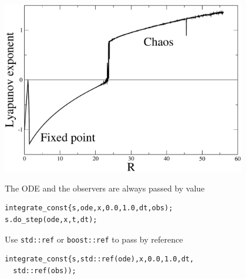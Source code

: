 \begin{frame}[fragile]


 \vspace{4ex}

\centerline{\includegraphics[draft=false,width=0.8\textwidth]{lyap_lorenz.pdf}}

\end{frame}







\begin{frame}

\end{frame}


\begin{frame}[fragile]

\vspace{2ex}

 The ODE and the observers are always passed by value

 \begin{lstlisting}
integrate_const{s,ode,x,0.0,1.0,dt,obs);
s.do_step(ode,x,t,dt);
 \end{lstlisting}

\pause

\vspace{2ex}
Use {\tt std::ref} or {\tt boost::ref} to pass by reference
 \begin{lstlisting}
integrate_const{s,std::ref(ode),x,0.0,1.0,dt,
  std::ref(obs));
 \end{lstlisting}

\end{frame}



